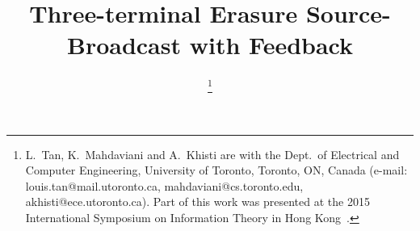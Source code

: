 \documentclass[journal,onecolumn,12pt,twoside]{IEEEtranTCOM}
\begin{document}
%
\title{Three-terminal Erasure Source-Broadcast with Feedback}
%
%


\author{
\thanks{L.~Tan, K.~Mahdaviani and A.~Khisti are with the Dept.\ of Electrical and Computer Engineering, University of Toronto, Toronto, ON, Canada (e-mail: louis.tan@mail.utoronto.ca, mahdaviani@cs.toronto.edu, akhisti@ece.utoronto.ca). 
Part of this work was presented at the 2015 International Symposium on Information Theory in Hong Kong~\cite{TMKS_ISIT15}.}%
}%
\end{document}
